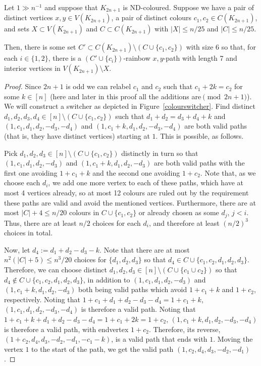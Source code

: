 \begin{lemma}\label{lem-switchpath}
Let $1\gg n^{-1}$ and suppose that $K_{2n+1}$ is ND-coloured. Suppose we have a pair of distinct vertices $x,y\in V(K_{2n+1})$, a pair of distinct colours $c_1,c_2\in C(K_{2n+1})$, and sets $X\subset V(K_{2n+1})$ and $C\subset C(K_{2n+1})$ with $|X|\leq n/25$ and $|C|\leq n/25$.

Then, there is some set $C'\subset C(K_{2n+1})\setminus (C\cup\{c_1,c_2\})$ with size $6$ so that, for each $i\in \{1,2\}$, there is a $(C'\cup\{c_i\})$-rainbow $x,y$-path with length 7 and interior vertices in $V(K_{2n+1})\setminus X$.
\end{lemma}
\begin{proof}
Since $2n+1$ is odd we can relabel $c_1$ and $c_2$ such that $c_1+2k=c_2$ for some $k\in [n]$ (here and later in this proof all the additions are$\pmod{2n+1}$). We will construct a switcher as depicted in Figure~\ref{colourswitcher}.
Find distinct $d_1,d_2,d_3,d_4\in [n]\setminus (C\cup \{c_1,c_2\})$ such that $d_1+d_2=d_3+d_4+k$ and  $(1,c_1,d_1,d_2,-d_3,-d_4)$ and $(1,c_1+k,d_1,d_2,-d_3,-d_4)$ are both valid paths (that is, they have distinct vertices) starting at $1$. This is possible, as follows.

Pick $d_1,d_2,d_3\in [n]\setminus (C\cup \{c_1,c_2\})$ distinctly in turn so that $(1,c_1,d_1,d_2,-d_3)$ and $(1,c_1+k,d_1,d_2,-d_3)$ are both valid paths with the first one avoiding $1+c_1+k$ and the second one avoiding $1+c_2$. Note that, as we choose each $d_i$, we add one more vertex to each of these paths, which have at most 4 vertices already, so at most 12 colours are ruled out by the requirement these paths are valid and avoid the mentioned vertices. Furthermore, there are at most $|C|+4\leq n/20$ colours in $C\cup \{c_1,c_2\}$ or already chosen as some $d_j$, $j<i$. Thus, there are at least $n/2$ choices for each $d_i$, and therefore at least $(n/2)^3$ choices in total.

Now, let $d_4:=d_1+d_2-d_3-k$. Note that there are at most $n^2(|C|+5)\leq n^3/20$ choices for $\{d_1,d_2,d_3\}$ so that $d_4\in C\cup\{c_1,c_2,d_1,d_2,d_3\}$. Therefore, we can choose distinct $d_1,d_2,d_3\in [n]\setminus (C\cup \{c_1\cup c_2\})$ so that $d_4\notin C\cup\{c_1,c_2,d_1,d_2,d_3\}$, in addition to  $(1,c_1,d_1,d_2,-d_3)$ and $(1,c_1+k,d_1,d_2,-d_3)$ both being valid paths which avoid $1+c_1+k$ and $1+c_2$, respectively. Noting that $1+c_1+d_1+d_2-d_3-d_4=1+c_1+k$, $(1,c_1,d_1,d_2,-d_3,-d_4)$ is therefore a valid path. Noting that $1+c_1+k+d_1+d_2-d_3-d_4=1+c_1+2k=1+c_2$, $(1,c_1+k,d_1,d_2,-d_3,-d_4)$  is therefore a valid path, with endvertex $1+c_2$. Therefore, its reverse,  $(1+c_2,d_4,d_3,-d_2,-d_1,-c_1-k)$, is a valid path that ends with $1$. Moving the vertex $1$ to the start of the path, we get the valid path $(1,c_2,d_4,d_3,-d_2,-d_1)$.


\end{proof}
